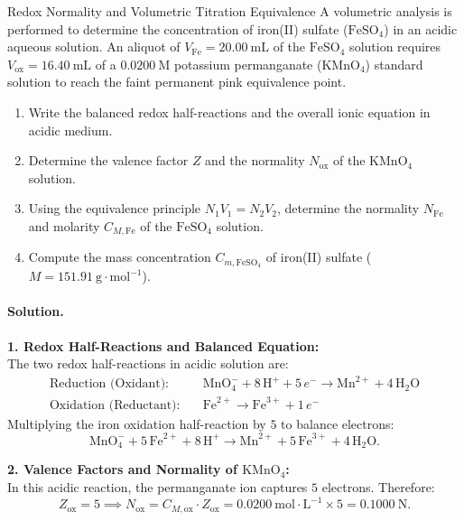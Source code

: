 \begin{workedexample}{Redox Normality and Volumetric Titration Equivalence}
A volumetric analysis is performed to determine the concentration of iron(II) sulfate ($\mathrm{FeSO_4}$) in an acidic aqueous solution. An aliquot of $V_{\text{Fe}} = 20.00\ \mathrm{mL}$ of the $\mathrm{FeSO_4}$ solution requires $V_{\text{ox}} = 16.40\ \mathrm{mL}$ of a $0.0200\ \mathrm{M}$ potassium permanganate ($\mathrm{KMnO_4}$) standard solution to reach the faint permanent pink equivalence point.
\begin{enumerate}[leftmargin=1.4em,itemsep=3pt]
  \item Write the balanced redox half-reactions and the overall ionic equation in acidic medium.
  \item Determine the valence factor $Z$ and the normality $N_{\text{ox}}$ of the $\mathrm{KMnO_4}$ solution.
  \item Using the equivalence principle $N_1 V_1 = N_2 V_2$, determine the normality $N_{\text{Fe}}$ and molarity $C_{M,\text{Fe}}$ of the $\mathrm{FeSO_4}$ solution.
  \item Compute the mass concentration $C_{m,\mathrm{FeSO_4}}$ of iron(II) sulfate ($M = 151.91\ \mathrm{g\cdot mol^{-1}}$).
\end{enumerate}

\paragraph{Solution.}
\textbf{1. Redox Half-Reactions and Balanced Equation:}\\
The two redox half-reactions in acidic solution are:
\begin{align*}
\text{Reduction (Oxidant):} \quad & \mathrm{MnO_4^-} + 8\,\mathrm{H}^+ + 5\,e^- \longrightarrow \mathrm{Mn}^{2+} + 4\,\mathrm{H_2O} \\
\text{Oxidation (Reductant):} \quad & \mathrm{Fe}^{2+} \longrightarrow \mathrm{Fe}^{3+} + 1\,e^-
\end{align*}
Multiplying the iron oxidation half-reaction by $5$ to balance electrons:
\[
\mathrm{MnO_4^-} + 5\,\mathrm{Fe}^{2+} + 8\,\mathrm{H}^+ \longrightarrow \mathrm{Mn}^{2+} + 5\,\mathrm{Fe}^{3+} + 4\,\mathrm{H_2O}.
\]

\textbf{2. Valence Factors and Normality of $\mathrm{KMnO_4}$:}\\
In this acidic reaction, the permanganate ion captures $5$ electrons. Therefore:
\[
Z_{\text{ox}} = 5 \implies N_{\text{ox}} = C_{M,\text{ox}} \cdot Z_{\text{ox}} = 0.0200\ \mathrm{mol\cdot L^{-1}} \times 5 = \mathbf{0.1000\ \mathrm{N}}.
\]


\end{workedexample}

